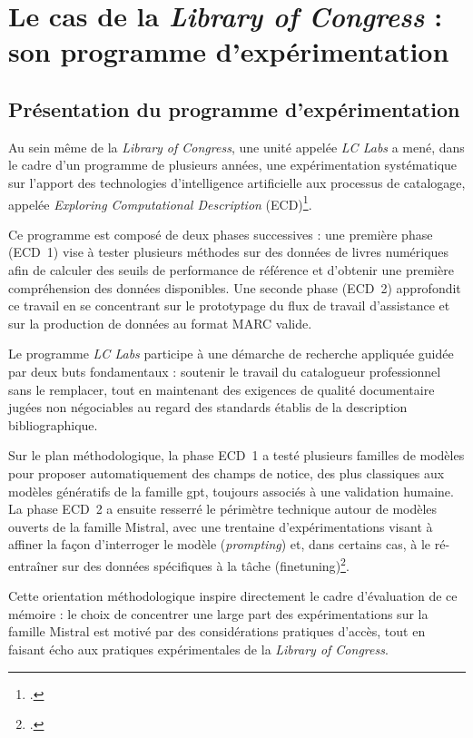 \section{Le cas de la \textit{Library of Congress} : son programme d'expérimentation }
\label{sec:lc-labs}

\subsection{Présentation du programme d'expérimentation}
\label{sec:lc-labs-presentation}

Au sein même de la \textit{Library of Congress}, une unité appelée \textit{LC Labs} a mené, dans le cadre d'un programme de plusieurs années, une expérimentation systématique sur l'apport des technologies d'intelligence artificielle aux processus de catalogage, appelée \textit{Exploring Computational Description} (ECD)\footcite{saccucci2025}.

Ce programme est composé de deux phases successives : une première phase (ECD~1) vise à tester plusieurs méthodes sur des données de livres numériques afin de calculer des seuils de performance de référence et d'obtenir une première compréhension des données disponibles. Une seconde phase (ECD~2) approfondit ce travail en se concentrant sur le prototypage du flux de travail d'assistance et sur la production de données au format MARC valide.

Le programme \textit{LC Labs} participe à une démarche de recherche appliquée guidée par deux buts fondamentaux : soutenir le travail du catalogueur professionnel sans le remplacer, tout en maintenant des exigences de qualité documentaire jugées non négociables au regard des standards établis de la description bibliographique.

Sur le plan méthodologique, la phase ECD~1 a testé plusieurs familles de modèles pour proposer automatiquement des champs de notice, des plus classiques aux modèles génératifs de la famille \gls{gpt}, toujours associés à une validation humaine. La phase ECD~2 a ensuite resserré le périmètre technique autour de modèles ouverts de la famille Mistral, avec une trentaine d'expérimentations visant à affiner la façon d'interroger le modèle (\textit{prompting}) et, dans certains cas, à le ré-entraîner sur des données spécifiques à la tâche (\gls{finetuning})\footcite{saccucci2025}.

Cette orientation méthodologique inspire directement le cadre d'évaluation de ce mémoire : le choix de concentrer une large part des expérimentations sur la famille Mistral est motivé par des considérations pratiques d'accès, tout en faisant écho aux pratiques expérimentales de la \textit{Library of Congress}.

